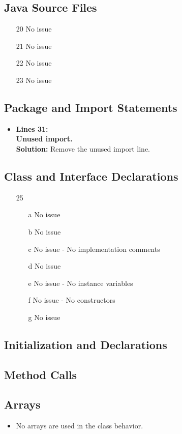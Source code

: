\subsection{Java Source Files}
\begin{itemize}
\item[20] No issue
\item[21] No issue
\item[22] No issue
\item[23] No issue
\end{itemize}
\subsection{Package and Import Statements}
\begin{itemize}[24]
	\item \textbf{Lines 31:}\\
	\textbf{Unused import.}\\
	\textbf{Solution: } Remove the unused import line.
	
\end{itemize}
\subsection{Class and Interface Declarations}
\begin{itemize}
\item[25]
\begin{itemize}
\item[a] No issue
\item[b] No issue
\item[c] No issue - No implementation comments
\item[d] No issue
\item[e] No issue - No instance variables
\item[f] No issue - No constructors
\item[g] No issue
\end{itemize}
\end{itemize}
\subsection{Initialization and Declarations}

\subsection{Method Calls}
\subsection{Arrays}
\begin{itemize}
	\item No arrays are used in the class behavior.
\end{itemize}
